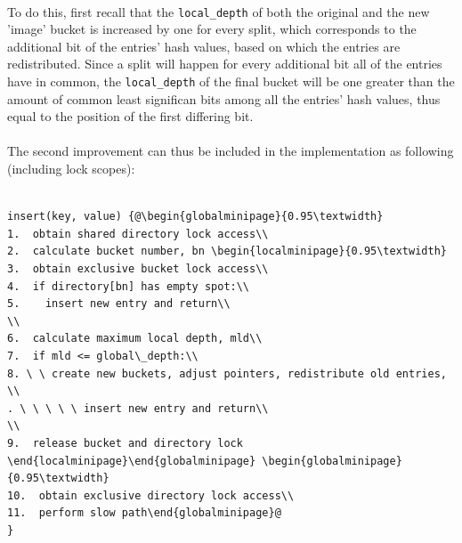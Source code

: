 \documentclass[11pt]{report} %
\begin{document}
\\
To do this, first recall that the \verb|local_depth| of both the original and the new 'image' bucket is increased by one for every split, which corresponds to the additional bit of the entries' hash values, based on which the entries are redistributed. Since a split will happen for every additional bit all of the entries have in common, the \verb|local_depth| of the final bucket will be one greater than the amount of common least significan bits among all the entries' hash values, thus equal to the position of the first differing bit. \\
\\
The second improvement can thus be included in the implementation as following (including lock scopes):\\
\\
\begin{fminipage}{\linewidth}
\begin{lstlisting}[escapechar=@]
insert(key, value) {@\begin{globalminipage}{0.95\textwidth}
1.  obtain shared directory lock access\\
2.  calculate bucket number, bn \begin{localminipage}{0.95\textwidth}
3.  obtain exclusive bucket lock access\\
4.  if directory[bn] has empty spot:\\
5.    insert new entry and return\\
\\
6.  calculate maximum local depth, mld\\
7.  if mld <= global\_depth:\\
8. \ \ create new buckets, adjust pointers, redistribute old entries, \\
. \ \ \ \ \ insert new entry and return\\
\\
9.  release bucket and directory lock \end{localminipage}\end{globalminipage} \begin{globalminipage}{0.95\textwidth}
10.  obtain exclusive directory lock access\\
11.  perform slow path\end{globalminipage}@
}
\end{lstlisting}
\end{fminipage}
\vphantom{fill}\\
\end{document}
